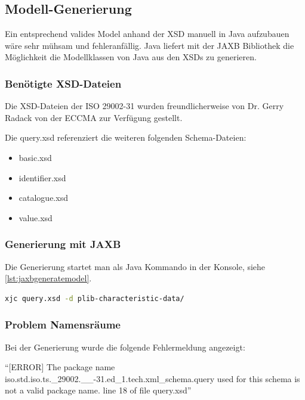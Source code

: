 \subsection{Modell-Generierung}\label{sec:modellgenerierung}

Ein entsprechend valides Model anhand der XSD manuell in Java aufzubauen wäre sehr mühsam und fehleranfällig. Java liefert mit der \gls{JAXB} Bibliothek die Möglichkeit die Modellklassen von Java aus den XSDs zu generieren.

\subsubsection{Benötigte XSD-Dateien}

Die XSD-Dateien der ISO 29002-31 wurden freundlicherweise von Dr. Gerry Radack von der \gls{ECCMA} zur Verfügung gestellt. 

Die query.xsd referenziert die weiteren folgenden Schema-Dateien:
\begin{itemize}
\item basic.xsd
\item identifier.xsd
\item catalogue.xsd
\item value.xsd
\end{itemize}

\subsubsection{Generierung mit JAXB}

Die Generierung startet man als Java Kommando in der Konsole, siehe \autoref{lst:jaxbgeneratemodel}.

\begin{lstlisting}[caption=JAXB Modellgenerierung mittels Konsolenbefehl, language=sh, label=lst:jaxbgeneratemodel]
xjc query.xsd -d plib-characteristic-data/ 
\end{lstlisting}

\subsubsection{Problem Namensräume}
Bei der Generierung wurde die folgende Fehlermeldung angezeigt:

\enquote{[ERROR] The package name iso.std.iso.ts.\_29002.\_\_-31.ed\_1.tech.xml\_schema.query used for this schema is not a valid package name. line 18 of file query.xsd}
  
